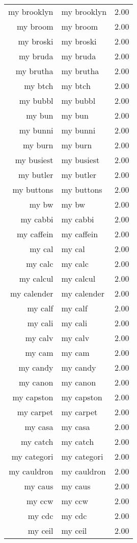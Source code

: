 \begin{table}[ht]
\begin{tabular}{rlr}
  my brooklyn & my brooklyn & 2.00 \\ 
  my broom & my broom & 2.00 \\ 
  my broski & my broski & 2.00 \\ 
  my bruda & my bruda & 2.00 \\ 
  my brutha & my brutha & 2.00 \\ 
  my btch & my btch & 2.00 \\ 
  my bubbl & my bubbl & 2.00 \\ 
  my bun & my bun & 2.00 \\ 
  my bunni & my bunni & 2.00 \\ 
  my burn & my burn & 2.00 \\ 
  my busiest & my busiest & 2.00 \\ 
  my butler & my butler & 2.00 \\ 
  my buttons & my buttons & 2.00 \\ 
  my bw & my bw & 2.00 \\ 
  my cabbi & my cabbi & 2.00 \\ 
  my caffein & my caffein & 2.00 \\ 
  my cal & my cal & 2.00 \\ 
  my calc & my calc & 2.00 \\ 
  my calcul & my calcul & 2.00 \\ 
  my calender & my calender & 2.00 \\ 
  my calf & my calf & 2.00 \\ 
  my cali & my cali & 2.00 \\ 
  my calv & my calv & 2.00 \\ 
  my cam & my cam & 2.00 \\ 
  my candy & my candy & 2.00 \\ 
  my canon & my canon & 2.00 \\ 
  my capston & my capston & 2.00 \\ 
  my carpet & my carpet & 2.00 \\ 
  my casa & my casa & 2.00 \\ 
  my catch & my catch & 2.00 \\ 
  my categori & my categori & 2.00 \\ 
  my cauldron & my cauldron & 2.00 \\ 
  my caus & my caus & 2.00 \\ 
  my ccw & my ccw & 2.00 \\ 
  my cdc & my cdc & 2.00 \\ 
  my ceil & my ceil & 2.00 \\ 

\end{tabular}
\end{table}
